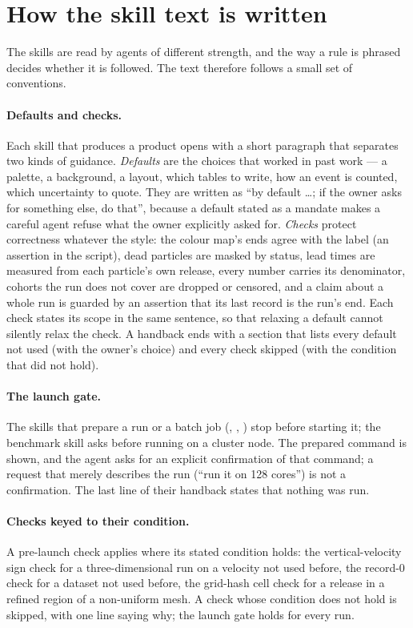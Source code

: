 \section{How the skill text is written}\label{sec:skills-design}

The skills are read by agents of different strength, and the way a rule is phrased decides whether
it is followed. The text therefore follows a small set of conventions.

\paragraph{Defaults and checks.} Each skill that produces a product opens with a short paragraph
that separates two kinds of guidance. \emph{Defaults} are the choices that worked in past work ---
a palette, a background, a layout, which tables to write, how an event is counted, which
uncertainty to quote. They are written as ``by default \dots; if the owner asks for something else,
do that'', because a default stated as a mandate makes a careful agent refuse what the owner
explicitly asked for. \emph{Checks} protect correctness whatever the style: the colour map's ends
agree with the label (an assertion in the script), dead particles are masked by status, lead times
are measured from each particle's own release, every number carries its denominator, cohorts the run
does not cover are dropped or censored, and a claim about a whole run is guarded by an assertion that
its last record is the run's end. Each check states its scope in the same sentence, so that
relaxing a default cannot silently relax the check. A handback ends with a section that lists every
default not used (with the owner's choice) and every check skipped (with the condition that did not
hold).

\paragraph{The launch gate.}\label{sec:skills-gate} The skills that prepare a run or a batch job (, ,
) stop before starting it; the benchmark skill asks before running on a cluster
node. The prepared command is shown, and the agent asks for an explicit
confirmation of that command; a request that merely describes the run (``run it on 128 cores'') is
not a confirmation. The last line of their handback states that nothing was run.

\paragraph{Checks keyed to their condition.} A pre-launch check applies where its stated condition
holds: the vertical-velocity sign check for a three-dimensional run on a velocity not used before,
the record-0 check for a dataset not used before, the grid-hash cell check for a release in a
refined region of a non-uniform mesh. A check whose condition does not hold is skipped, with one
line saying why; the launch gate holds for every run.

